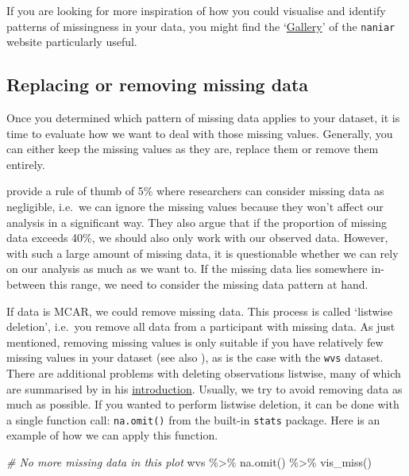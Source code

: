 \documentclass[
]{book}
\newenvironment{Shaded}{\begin{snugshade}}{\end{snugshade}}
\newcommand{\CommentTok}[1]{\textcolor[rgb]{0.56,0.35,0.01}{\textit{#1}}}
\newcommand{\FunctionTok}[1]{\textcolor[rgb]{0.00,0.00,0.00}{#1}}
\newcommand{\NormalTok}[1]{#1}
\newcommand{\SpecialCharTok}[1]{\textcolor[rgb]{0.00,0.00,0.00}{#1}}
\begin{document}
If you are looking for more inspiration of how you could visualise and identify patterns of missingness in your data, you might find the `\href{https://naniar.njtierney.com/articles/naniar-visualisation.html}{Gallery}' of the \texttt{naniar} website particularly useful.

\hypertarget{replacing-removing-missing-data}{%
\subsection{Replacing or removing missing data}\label{replacing-removing-missing-data}}

Once you determined which pattern of missing data applies to your dataset, it is time to evaluate how we want to deal with those missing values. Generally, you can either keep the missing values as they are, replace them or remove them entirely.

\citet{jakobsen-et-al-2017} provide a rule of thumb of 5\% where researchers can consider missing data as negligible, i.e.~we can ignore the missing values because they won't affect our analysis in a significant way. They also argue that if the proportion of missing data exceeds 40\%, we should also only work with our observed data. However, with such a large amount of missing data, it is questionable whether we can rely on our analysis as much as we want to. If the missing data lies somewhere in-between this range, we need to consider the missing data pattern at hand.

If data is MCAR, we could remove missing data. This process is called `listwise deletion', i.e.~you remove all data from a participant with missing data. As just mentioned, removing missing values is only suitable if you have relatively few missing values in your dataset (see also \citet{schafer-1999}), as is the case with the \texttt{wvs} dataset. There are additional problems with deleting observations listwise, many of which are summarised by \citet{van-buuren-2018} in his \href{https://stefvanbuuren.name/fimd/sec-simplesolutions.html}{introduction}. Usually, we try to avoid removing data as much as possible. If you wanted to perform listwise deletion, it can be done with a single function call: \texttt{na.omit()} from the built-in \texttt{stats} package. Here is an example of how we can apply this function.

\begin{Shaded}
\begin{Highlighting}[]
\CommentTok{\# No more missing data in this plot}
\NormalTok{wvs }\SpecialCharTok{\%\textgreater{}\%} \FunctionTok{na.omit}\NormalTok{() }\SpecialCharTok{\%\textgreater{}\%} \FunctionTok{vis\_miss}\NormalTok{()}
\end{Highlighting}
\end{Shaded}
\end{document}
